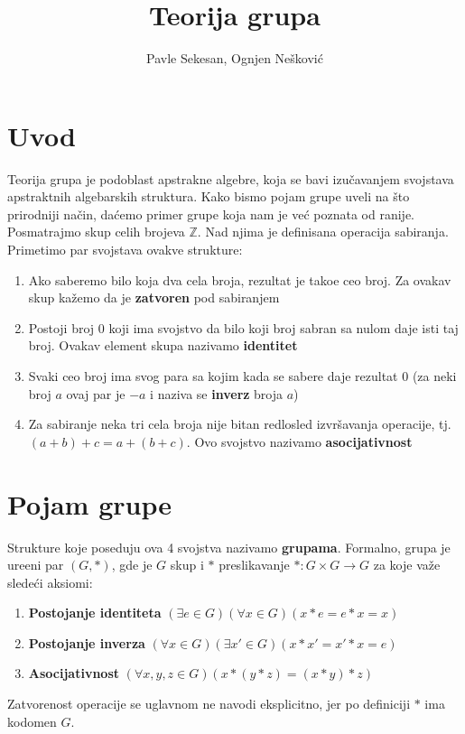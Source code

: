 \documentclass{article}
\title{Teorija grupa}
\author{Pavle  Sekesan, Ognjen Nešković}
\begin{document}
\maketitle

\section{Uvod}
Teorija grupa je podoblast apstrakne algebre, koja se bavi izučavanjem svojstava apstraktnih algebarskih struktura. Kako bismo pojam grupe uveli na što prirodniji način, daćemo primer grupe koja nam je već poznata od ranije. Posmatrajmo skup celih brojeva $\mathbb{Z}$. Nad njima je definisana operacija sabiranja. Primetimo par svojstava ovakve strukture:
\begin{enumerate}
    \item Ako saberemo bilo koja dva cela broja, rezultat je tako\dj e ceo broj. Za ovakav skup kažemo da je \textbf{zatvoren} pod sabiranjem
    \item Postoji broj 0 koji ima svojstvo da bilo koji broj sabran sa nulom daje isti taj broj. Ovakav element skupa nazivamo \textbf{identitet}
    \item Svaki ceo broj ima svog para sa kojim kada se sabere daje rezultat 0 (za neki broj $a$ ovaj par je $-a$ i naziva se \textbf{inverz} broja $a$)
    \item Za sabiranje neka tri cela broja nije bitan redlosled izvršavanja operacije, tj. $(a+b)+c=a+(b+c)$. Ovo svojstvo nazivamo \textbf{asocijativnost}
\end{enumerate}

\section{Pojam grupe}
Strukture koje poseduju ova 4 svojstva nazivamo \textbf{grupama}. Formalno, grupa je ure\dj eni par $(G, *)$,  gde je $G$ skup i $*$ preslikavanje $* : G \times G \rightarrow G$  za koje važe sledeći aksiomi:
\begin{enumerate}
    \item \textbf{Postojanje identiteta} $(\exists e \in G) (\forall x \in G) (x*e=e*x=x)$
    \item \textbf{Postojanje inverza} $(\forall x \in G) (\exists x' \in G) (x*x'=x'*x=e)$
    \item \textbf{Asocijativnost} $(\forall x, y, z \in G) (x*(y*z)=(x*y)*z)$
\end{enumerate}

Zatvorenost operacije se uglavnom ne navodi eksplicitno, jer po definiciji $*$ ima kodomen $G$.
\end{document}
